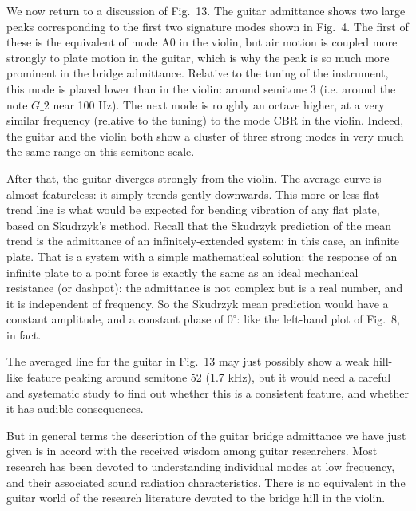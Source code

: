 
  We now return to a discussion of Fig.\ 13. The guitar admittance shows two 
  large peaks corresponding to the first two signature modes shown in Fig.\ 4. 
  The first of these is the equivalent of mode A0 in the violin, but air motion 
  is coupled more strongly to plate motion in the guitar, which is why the peak 
  is so much more prominent in the bridge admittance. Relative to the tuning of 
  the instrument, this mode is placed lower than in the violin: around semitone 
  3 (i.e. around the note $G\_2$ near 100 Hz). The next mode is roughly an 
  octave higher, at a very similar frequency (relative to the tuning) to the 
  mode CBR in the violin. Indeed, the guitar and the violin both show a cluster 
  of three strong modes in very much the same range on this semitone scale. 

  After that, the guitar diverges strongly from the violin. The average curve 
  is almost featureless: it simply trends gently downwards. This more-or-less 
  flat trend line is what would be expected for bending vibration of any flat 
  plate, based on Skudrzyk's method. Recall that the Skudrzyk prediction of the 
  mean trend is the admittance of an infinitely-extended system: in this case, 
  an infinite plate. That is a system with a simple mathematical solution: the 
  response of an infinite plate to a point force is exactly the same as an 
  ideal mechanical resistance (or dashpot): the admittance is not complex but 
  is a real number, and it is independent of frequency. So the Skudrzyk mean 
  prediction would have a constant amplitude, and a constant phase of 
  $0^\circ$: like the left-hand plot of Fig.\ 8, in fact. 

  The averaged line for the guitar in Fig.\ 13 may just possibly show a weak 
  hill-like feature peaking around semitone 52 (1.7 kHz), but it would need a 
  careful and systematic study to find out whether this is a consistent 
  feature, and whether it has audible consequences. 

  But in general terms the description of the guitar bridge admittance we have 
  just given is in accord with the received wisdom among guitar researchers. 
  Most research has been devoted to understanding individual modes at low 
  frequency, and their associated sound radiation characteristics. There is no 
  equivalent in the guitar world of the research literature devoted to the 
  bridge hill in the violin. 


